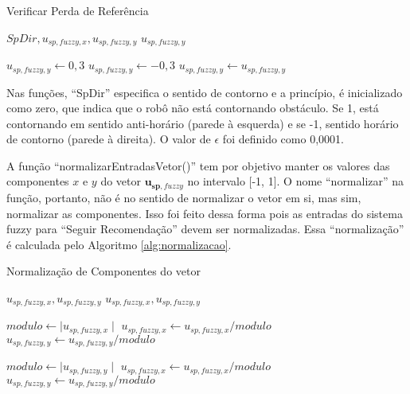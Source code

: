 	\begin{algorithm}
		\caption{Verificar Perda de Referência}
		\label{alg:verificarPerdaReferencia}%
		\begin{algorithmic}[1]
	
		\REQUIRE $SpDir, u_{sp,\mathit{fuzzy}, x}, u_{sp,\mathit{fuzzy}, y}$
		\ENSURE $u_{sp,\mathit{fuzzy}, y}$
		
				\STATE $u_{sp,\mathit{fuzzy}, y} \leftarrow 0,3$
				\STATE $u_{sp,\mathit{fuzzy}, y} \leftarrow -0,3$
			\ELSE
				\STATE $u_{sp,\mathit{fuzzy}, y} \leftarrow u_{sp,\mathit{fuzzy}, y}$
			\ENDIF
		\ENDIF
	
		\end{algorithmic}
	\end{algorithm}
	
	Nas funções, ``SpDir'' especifica o sentido de contorno e a princípio, é inicializado
	como zero, que indica que o robô não está contornando obstáculo. Se 1, está contornando em 
	sentido anti-horário (parede à esquerda) e se -1, sentido horário de contorno (parede à 
	direita). O valor de $\epsilon$ foi definido como 0,0001. 
	
 	A função ``normalizarEntradasVetor()'' tem por objetivo manter os valores das componentes
 	$x$ e $y$ do vetor $\mathbf{u_{sp,\mathit{fuzzy}}}$ no intervalo [-1, 1]. O nome ``normalizar''
 	na função, portanto, não é no sentido de normalizar o vetor em si, mas sim, normalizar
 	as componentes. Isso foi feito dessa forma pois as entradas do sistema fuzzy para ``Seguir
 	Recomendação'' devem ser normalizadas. Essa ``normalização'' é calculada pelo Algoritmo
 	\ref{alg:normalizacao}.
	\begin{algorithm}
		\caption{Normalização de Componentes do vetor}
		\label{alg:normalizacao}%
		\begin{algorithmic}[1]
	
		\REQUIRE $u_{sp,\mathit{fuzzy}, x}, u_{sp,\mathit{fuzzy}, y}$
		\ENSURE $u_{sp,\mathit{fuzzy}, x}, u_{sp,\mathit{fuzzy}, y}$
		
		\STATE $modulo \leftarrow \mid u_{sp,\mathit{fuzzy}, x} \mid$
		\IF{$modulo > 1$}
			\STATE $u_{sp,\mathit{fuzzy}, x} \leftarrow u_{sp,\mathit{fuzzy}, x}/modulo$
			\STATE $u_{sp,\mathit{fuzzy}, y} \leftarrow u_{sp,\mathit{fuzzy}, y}/modulo$
		\ENDIF
		
		\STATE $modulo \leftarrow \mid u_{sp,\mathit{fuzzy}, y} \mid$
		\IF{$modulo > 1$}
			\STATE $u_{sp,\mathit{fuzzy}, x} \leftarrow u_{sp,\mathit{fuzzy}, x}/modulo$
			\STATE $u_{sp,\mathit{fuzzy}, y} \leftarrow u_{sp,\mathit{fuzzy}, y}/modulo$
		\ENDIF
	
		\end{algorithmic}
	\end{algorithm}
	
